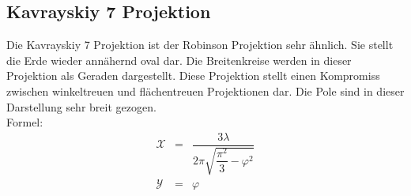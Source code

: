 \subsection{Kavrayskiy 7 Projektion}
\label{sec:kravrayskiy}
Die Kavrayskiy 7 Projektion ist der Robinson Projektion sehr ähnlich. Sie stellt die Erde wieder annähernd oval dar. Die Breitenkreise werden in dieser Projektion als Geraden dargestellt. Diese Projektion stellt einen Kompromiss zwischen winkeltreuen und flächentreuen Projektionen dar. Die Pole sind in dieser Darstellung sehr breit gezogen. \\
Formel:\\
\begin{eqnarray}
\mathcal {X} & = & \dfrac {3\lambda } {2\pi \sqrt {\dfrac {\pi ^2}{3}-\varphi ^2}}\\
\mathcal {Y} & = &\varphi
\end{eqnarray}